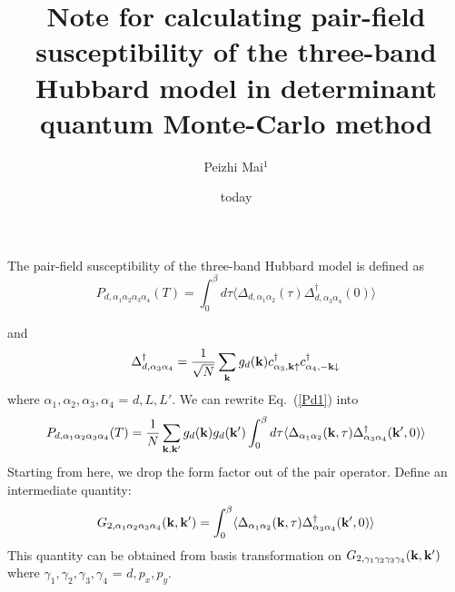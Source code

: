 \documentclass[arXiv, preprint,url,nofootinbib]{revtex4}
\newcommand{\beq}{\begin{equation}}
\newcommand{\eeq}{\end{equation}}
\newcommand{\disp}[1]{Eq.~(\ref{#1})}
\begin{document}
\title{Note for calculating pair-field susceptibility of the three-band Hubbard model in determinant quantum Monte-Carlo method}

\author{Peizhi Mai$^{1}$\\}

\maketitle
\date{today}

The pair-field susceptibility of the three-band Hubbard model is defined as 
\beq
P_{d,\alpha_1 \alpha_2 \alpha_3 \alpha_4}(T) = \int_0^{\beta} d\tau \langle \Delta_{d,\alpha_1 \alpha_2}(\tau)  \Delta^{\dagger}_{d,\alpha_3 \alpha_4}(0)    \rangle \label{Pd1}
\eeq

and 
\beq
\Delta^{\dagger}_{d,\alpha_3 \alpha_4} = \frac{1}{\sqrt{N}} \sum_{\bf k} g_d({\bf k}) c^{\dagger}_{\alpha_3,{\bf k}\uparrow} c^{\dagger}_{\alpha_4,-{\bf k}\downarrow}
\eeq
where $\alpha_1, \alpha_2, \alpha_3, \alpha_4$ = $d, L, L'$.
We can rewrite \disp{Pd1} into
\beq
P_{d,\alpha_1 \alpha_2 \alpha_3 \alpha_4}(T) =\frac{1}{N} \sum_{{\bf k, k'}}g_d({\bf k})g_d({\bf k'})\int_0^{\beta} d\tau \langle \Delta_{\alpha_1 \alpha_2}({\bf k},\tau)  \Delta^{\dagger}_{\alpha_3 \alpha_4}({\bf k'},0)    \rangle
\eeq
Starting from here, we drop the form factor out of the pair operator. Define an intermediate quantity:
\beq
G_{2,\alpha_1 \alpha_2 \alpha_3 \alpha_4}({\bf k, k'}) = \int_0^{\beta} \langle \Delta_{\alpha_1 \alpha_2}({\bf k},\tau)  \Delta^{\dagger}_{\alpha_3 \alpha_4}({\bf k'},0)    \rangle
\eeq
This quantity can be obtained from basis transformation on $G_{2, \gamma_1 \gamma_2 \gamma_3\gamma_4}({\bf k, k'})$ where $\gamma_1, \gamma_2, \gamma_3, \gamma_4$ = $d, p_x, p_y$.
\end{document}
